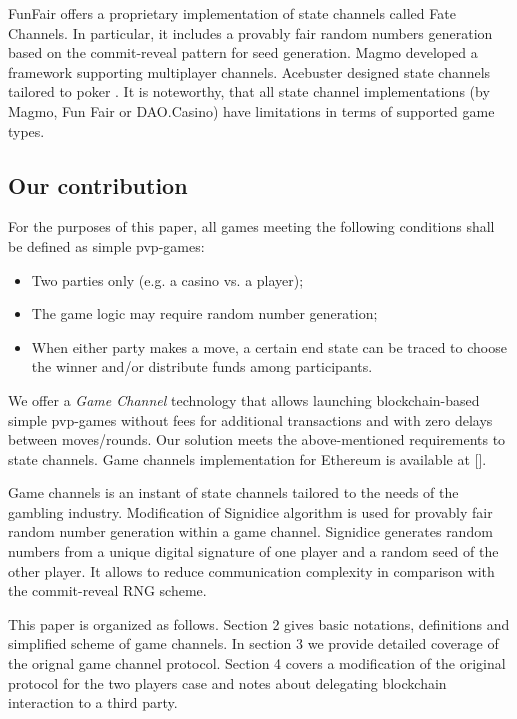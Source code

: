 	FunFair \cite{bib15} offers a proprietary implementation of state channels called Fate Channels. In particular, it includes a provably fair random numbers generation based on the commit-reveal pattern for seed generation. Magmo \cite{bib16} developed a framework supporting multiplayer channels. Acebuster designed  state channels tailored to poker \cite{bib17}. It is noteworthy, that all state channel implementations (by Magmo, Fun Fair or DAO.Casino) have limitations in terms of supported game types.

		\subsection {Our contribution}
	For the purposes of this paper, all games meeting the following conditions shall be defined as simple pvp-games:
	\begin{itemize}
		\item Two parties only (e.g. a casino vs. a player);
		\item The game logic may require random number generation;
		\item When either party makes a move, a certain end state can be traced to choose the winner and/or distribute funds among participants.
	\end{itemize}
	We offer a \textit {Game Channel} technology that allows launching blockchain-based simple pvp-games without fees for additional transactions and with zero delays between moves/rounds. Our solution meets the above-mentioned requirements to state channels. Game channels implementation for Ethereum is available at [].

	Game channels is an instant of state channels tailored to the needs of the gambling industry. Modification of Signidice \cite{bib18} algorithm is used for provably fair random number generation within a game channel. Signidice generates random numbers from a unique digital signature of one player and a random seed of the other player. It allows to reduce communication complexity in comparison with the commit-reveal RNG scheme. 

This paper is organized as follows. Section 2 gives basic notations, definitions and simplified scheme of game channels. In section 3 we provide detailed coverage of the orignal game channel protocol. Section 4 covers a modification of the original protocol for the two players case and notes about delegating blockchain interaction to a third party.